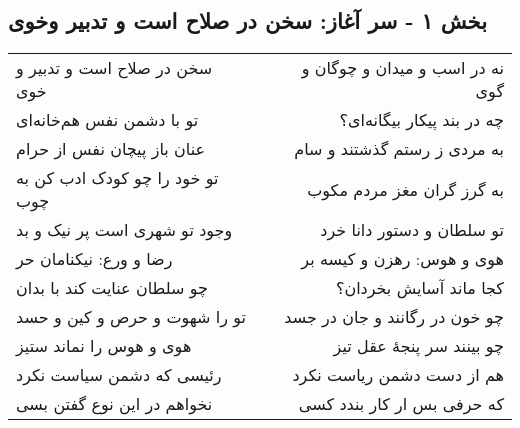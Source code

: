\begin{center}
\section*{بخش ۱ - سر آغاز: سخن در صلاح است و تدبیر وخوی}
\label{sec:001}
\begin{longtable}{l p{0.5cm} r}
سخن در صلاح است و تدبیر و خوی
&&
نه در اسب و میدان و چوگان و گوی
\\
تو با دشمن نفس هم‌خانه‌ای
&&
چه در بند پیکار بیگانه‌ای؟
\\
عنان باز پیچان نفس از حرام
&&
به مردی ز رستم گذشتند و سام
\\
تو خود را چو کودک ادب کن به چوب
&&
به گرز گران مغز مردم مکوب
\\
وجود تو شهری است پر نیک و بد
&&
تو سلطان و دستور دانا خرد
\\
رضا و ورع: نیکنامان حر
&&
هوی و هوس: رهزن و کیسه بر
\\
چو سلطان عنایت کند با بدان
&&
کجا ماند آسایش بخردان؟
\\
تو را شهوت و حرص و کین و حسد
&&
چو خون در رگانند و جان در جسد
\\
هوی و هوس را نماند ستیز
&&
چو بینند سر پنجهٔ عقل تیز
\\
رئیسی که دشمن سیاست نکرد
&&
هم از دست دشمن ریاست نکرد
\\
نخواهم در این نوع گفتن بسی
&&
که حرفی بس ار کار بندد کسی
\\
\end{longtable}
\end{center}

